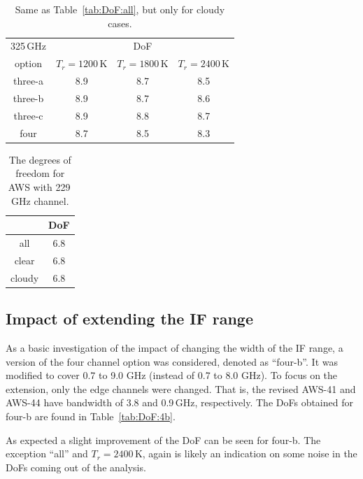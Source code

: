 \documentclass[12pt]{article}
\begin{document}
\begin{table}[!p]
	\centering
	\begin{tabular}[b]{c|c|c|c}
	325\,GHz & \multicolumn{3}{c}{DoF}   \\
	option &  $T_r = 1200 $\,K &   $T_r = 1800 $\,K &   $T_r = 2400$\,K \\
		\hline
		three-a &              8.9 &              8.7 &              8.5 \\		
		three-b &              8.9 &              8.7 &              8.6 \\		
		three-c &              8.9 &              8.8 &              8.7 \\		
		four    &              8.7 &              8.5 &              8.3 \\
		\hline
	\end{tabular}
	\caption{Same as Table~\ref{tab:DoF:all}, but only for cloudy cases.  }
	\label{tab:DoF:cloudy}
\end{table}

\begin{table}[!p]
	\centering
	\begin{tabular}[b]{c|c}
		&   DoF \\
		\hline
		all    &      6.8        \\
		clear  &      6.8        \\
		cloudy &      6.8        \\
		\hline
	\end{tabular}
	\caption{The degrees of freedom for AWS with 229\,GHz channel. }
	\label{tab:DoF:4X}
\end{table}


\subsection{Impact of extending the IF range}
%
As a basic investigation of the impact of changing the width of the IF range, a
version of the four channel option was considered, denoted as ``four-b''. It was
modified to cover 0.7 to 9.0 GHz (instead of 0.7 to 8.0 GHz). To focus on the
extension, only the edge channels were changed. That is, the revised AWS-41 and AWS-44
have bandwidth of 3.8 and 0.9\,GHz, respectively. The DoFs obtained for four-b
are found in Table~\ref{tab:DoF:4b}.

As expected a slight improvement of the DoF can be seen for four-b. The
exception ``all'' and $T_r=2400$\,K, again is likely an indication on some noise
in the DoFs coming out of the analysis.
\end{document}
